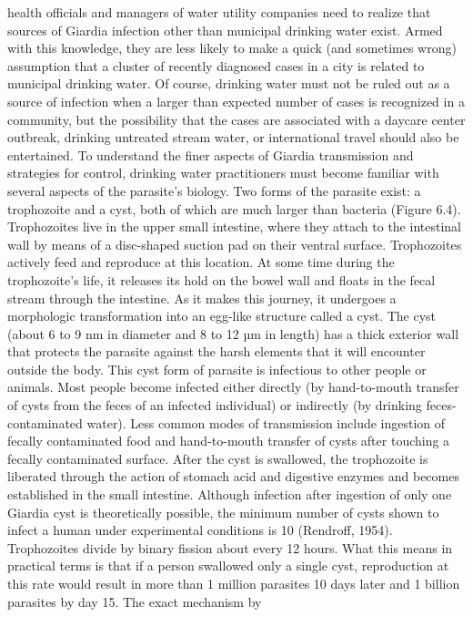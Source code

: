 \documentclass{article}
\begin{document}
health officials and managers of water utility companies need to realize
that sources of Giardia infection other than municipal drinking water
exist. Armed with this knowledge, they are less likely to make a quick
(and sometimes wrong) assumption that a cluster of recently diagnosed
cases in a city is related to municipal drinking water. Of course,
drinking water must not be ruled out as a source of infection when a
larger than expected number of cases is recognized in a community, but
the possibility that the cases are associated with a daycare center
outbreak, drinking untreated stream water, or international travel
should also be entertained. To understand the finer aspects of Giardia
transmission and strategies for control, drinking water practitioners
must become familiar with several aspects of the parasite's biology. Two
forms of the parasite exist: a trophozoite and a cyst, both of which are
much larger than bacteria (Figure 6.4). Trophozoites live in the upper
small intestine, where they attach to the intestinal wall by means of a
disc-shaped suction pad on their ventral surface. Trophozoites actively
feed and reproduce at this location. At some time during the
trophozoite's life, it releases its hold on the bowel wall and floats in
the fecal stream through the intestine. As it makes this journey, it
undergoes a morphologic transformation into an egg-like structure called
a cyst. The cyst (about 6 to 9 nm in diameter and 8 to 12 µm in length)
has a thick exterior wall that protects the parasite against the harsh
elements that it will encounter outside the body. This cyst form of
parasite is infectious to other people or animals. Most people become
infected either directly (by hand-to-mouth transfer of cysts from the
feces of an infected individual) or indirectly (by drinking
feces-contaminated water). Less common modes of transmission include
ingestion of fecally contaminated food and hand-to-mouth transfer of
cysts after touching a fecally contaminated surface. After the cyst is
swallowed, the trophozoite is liberated through the action of stomach
acid and digestive enzymes and becomes established in the small
intestine. Although infection after ingestion of only one Giardia cyst
is theoretically possible, the minimum number of cysts shown to infect a
human under experimental conditions is 10 (Rendroff, 1954). Trophozoites
divide by binary fission about every 12 hours. What this means in
practical terms is that if a person swallowed only a single cyst,
reproduction at this rate would result in more than 1 million parasites
10 days later and 1 billion parasites by day 15. The exact mechanism by
\end{document}
